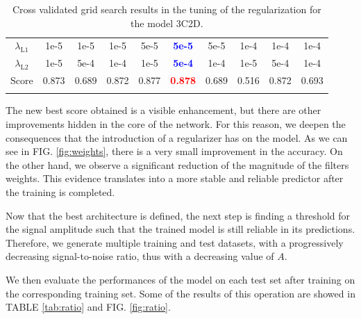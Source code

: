 \documentclass[prl,twocolumn]{revtex4-1}
\newcommand{\figref}[1]{FIG. \ref{#1}}
\newcommand{\tabref}[1]{TABLE \ref{#1}}
\begin{document}
\begin{table}[!h]
\begin{tabular}{c|ccccccccc}
        \colrule
        {\small $\lambda_\mathrm{L1}$}  &  {\scriptsize 1e-5} & 
{\scriptsize 1e-5} & 
{\scriptsize 1e-5} & 
{\scriptsize 5e-5} & 
{\scriptsize \textcolor{blue}{\bf5e-5}} & 
{\scriptsize 5e-5} & 
{\scriptsize 1e-4} & 
{\scriptsize 1e-4} & 
{\scriptsize 1e-4}\\
        {\small $\lambda_\mathrm{L2}$}  &   {\scriptsize 1e-5} & 
{\scriptsize 5e-4} & 
{\scriptsize 1e-4} & 
{\scriptsize 1e-5} & 
{\scriptsize \textcolor{blue}{\bf5e-4}} & 
{\scriptsize 1e-4} & 
{\scriptsize 1e-5} & 
{\scriptsize 5e-4} & 
{\scriptsize 1e-4}\\
        {\small Score}   & {\scriptsize 0.873} & 
{\scriptsize 0.689} & 
{\scriptsize 0.872} & 
{\scriptsize 0.877} & 
{\scriptsize \textcolor{red}{\bf0.878}} & 
{\scriptsize 0.689} & 
{\scriptsize 0.516} & 
{\scriptsize 0.872} & 
{\scriptsize 0.693} \\
        \botrule
    \end{tabular}
    \caption{Cross validated grid search results in the tuning of the regularization for the model 3C2D.}
    \label{tab:reg}
    
    \vspace{-7mm}
\end{table}

The new best score obtained is a visible enhancement, but there are other improvements hidden in the core of the network. For this reason, we deepen the consequences that the introduction of a regularizer has on the model. As we can see in \figref{fig:weights}, there is a very small improvement in the accuracy. On the other hand, we observe a significant reduction of the magnitude of the filters weights. This evidence translates into a more stable and reliable predictor after the training is completed.


Now that the best architecture is defined, the next step is finding a threshold for the signal amplitude such that the trained model is still reliable in its predictions. Therefore, we generate multiple training and test datasets, with a progressively decreasing signal-to-noise ratio, thus with a decreasing value of $A$. 

We then evaluate the performances of the model on each test set after training on the corresponding training set. Some of the results of this operation are showed in \tabref{tab:ratio} and \figref{fig:ratio}.
\end{document}
